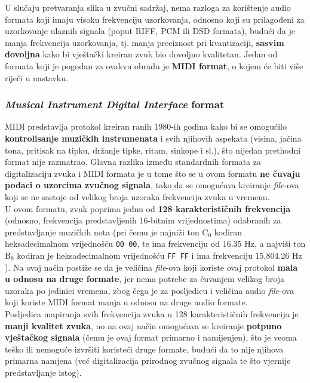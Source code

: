 \documentclass[12pt,a4paper]{article}
\begin{document}
U slučaju pretvaranja slika u zvučni sadržaj, nema razloga za korištenje audio formata koji imaju visoku frekvenciju uzorkovanja, odnosno koji su prilagođeni za uzorkovanje ulaznih signala (poput RIFF, PCM ili DSD formata), budući da je manja frekvencija uzorkovanja, tj. manja preciznost pri kvantizaciji, \textbf{sasvim dovoljna} kako bi vještački kreiran zvuk bio dovoljno kvalitetan. Jedan od formata koji je pogodan za ovakvu obradu je \textbf{MIDI format}, o kojem će biti više riječi u nastavku.

\subsubsection{\textit{Musical Instrument Digital Interface} format}

MIDI predstavlja protokol kreiran ranih 1980-ih godina kako bi se omogućilo \textbf{kontrolisanje muzičkih instrumenata} i svih njihovih aspekata (visina, jačina tona, pritisak na tipku, držanje tipke, ritam, sinkope i sl.), što nijedan prethodni format nije razmatrao. Glavna razlika između standardnih formata za digitalizaciju zvuka i MIDI formata je u tome što se u ovom formatu \textbf{ne čuvaju podaci o uzorcima zvučnog signala}, tako da se omogućava kreiranje \textit{file}-ova koji se ne sastoje od velikog broja uzoraka frekvencija zvuka u vremenu. \\

U ovom formatu, zvuk poprima jednu od \textbf{128 karakterističnih frekvencija} (odnosno, frekvencija predstavljenih 16-bitnim vrijednostima) odabranih za predstavljanje muzičkih nota (pri čemu je najniži ton C$_0$ kodiran heksadecimalnom vrijednošću \texttt{00 00}, te ima frekvenciju od 16.35 Hz, a najviši ton B$_9$ kodiran je heksadecimalnom vrijednošću \texttt{FF FF} i ima frekvenciju 15,804.26 Hz \cite{frequencies}). Na ovaj način postiže se da je veličina \textit{file}-ova koji koriste ovaj protokol \textbf{mala u odnosu na druge formate}, jer nema potrebe za čuvanjem velikog broja uzoraka po jedinici vremena, zbog čega je za posljedicu i veličina audio \textit{file}-ova koji koriste MIDI format manja u odnosu na druge audio formate. \cite{dat} \\

Posljedica mapiranja svih frekvencija zvuka u 128 karakterističnih frekvencija je \textbf{manji kvalitet zvuka}, no na ovaj način omogućava se kreiranje \textbf{potpuno vještačkog signala} (čemu je ovaj format primarno i namijenjen), što je veoma teško ili nemoguće izvršiti koristeći druge formate, budući da to nije njihova primarna namjena (već digitalizacija prirodnog zvučnog signala te što vjernije predstavljanje istog). \\
\end{document}
